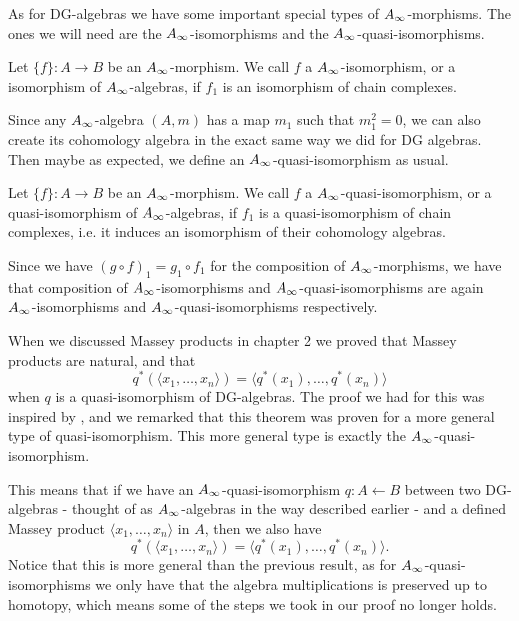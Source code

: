 As for DG-algebras we have some important special types of $\A$-morphisms. The ones we will need are the $\A$-isomorphisms and the $\A$-quasi-isomorphisms.

\begin{definition}[$\A$-isomorphism]
Let $\{f\}:A\longrightarrow B$ be an $\A$-morphism. We call $f$ a $\A$-isomorphism, or a isomorphism of $\A$-algebras, if $f_1$ is an isomorphism of chain complexes.
\end{definition}

Since any $\A$-algebra $(A, m)$ has a map $m_1$ such that $m_1^2=0$, we can also create its cohomology algebra in the exact same way we did for DG algebras. Then maybe as expected, we define an $\A$-quasi-isomorphism as usual.

\begin{definition}
Let $\{f\}:A\longrightarrow B$ be an $\A$-morphism. We call $f$ a $\A$-quasi-isomorphism, or a quasi-isomorphism of $\A$-algebras, if $f_1$ is a quasi-isomorphism of chain complexes, i.e. it induces an isomorphism of their cohomology algebras. 
\end{definition}

Since we have $(g\circ f)_1 = g_1\circ f_1$ for the composition of $\A$-morphisms, we have that composition of $\A$-isomorphisms and $\A$-quasi-isomorphisms are again $\A$-isomorphisms and $\A$-quasi-isomorphisms respectively.

\begin{remark}
When we discussed Massey products in chapter 2 we proved that Massey products are natural, and that 
\begin{equation*}
	q^*(\langle x_1, \ldots, x_n\rangle ) = \langle q^*(x_1),\ldots, q^*(x_n)\rangle
\end{equation*}
when $q$ is a quasi-isomorphism of DG-algebras. The proof we had for this was inspired by \cite[Theorem 1.5]{naturality}, and we remarked that this theorem was proven for a more general type of quasi-isomorphism. This more general type is exactly the $\A$-quasi-isomorphism.

This means that if we have an $\A$-quasi-isomorphism $q\colon A\longleftarrow B$ between two DG-algebras - thought of as $\A$-algebras in the way described earlier - and a defined Massey product $\langle x_1, \ldots, x_n\rangle$ in $A$, then we also have
\begin{equation*}
	q^*(\langle x_1, \ldots, x_n\rangle ) = \langle q^*(x_1),\ldots, q^*(x_n)\rangle .
\end{equation*}
Notice that this is more general than the previous result, as for $\A$-quasi-isomorphisms we only have that the algebra multiplications is preserved up to homotopy, which means some of the steps we took in our proof no longer holds. 
\end{remark}




